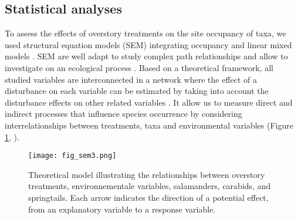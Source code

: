 \subsection*{Statistical analyses}
\label{subsec:analyses}

To assess the effects of overstory treatments on the site occupancy of taxa, we used structural equation models (SEM) integrating occupancy and linear mixed models \citep{graceSpecificationStructuralEquation2010,josephIntegratingOccupancyModels2016,mackenzieOccupancyEstimationModeling2006a}.
SEM are well adapt to study complex path relationships and allow to investigate on an ecological process \citep{graceStructuralEquationModeling2008}.
Based on a theoretical framework, all studied variables are interconnected in a network where the effect of a disturbance on each variable can be estimated by taking into account 
the disturbance effects on other related variables \citep{graceStructuralEquationModeling2008}.
It allow us to measure direct and indirect processes that influence species occurrence by considering interrelationships between treatments, taxa and environmental variables (Figure \ref*{fig:SEM}, \citealp{graceSpecificationStructuralEquation2010}).

\begin{figure}[ht!]
	\centering
	\texttt{[image: fig\_sem3.png]}
	\caption[Theoretical model illustrating the relationships between overstory treatments, environmental variables and taxa.]{Theoretical model illustrating the relationships between overstory treatments, environnementale variables, salamanders, carabids, and springtails. 
  Each arrow indicates the direction of a potential effect, from an explanatory variable to a response variable.}
	\label{fig:SEM}
	\end{figure}  


